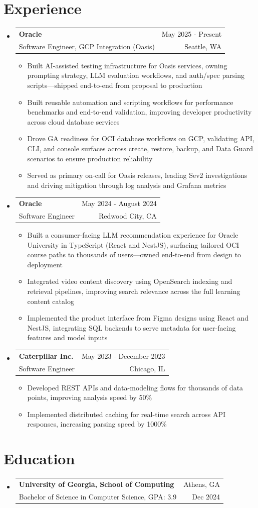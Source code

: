 \documentclass[letterpaper,11pt]{article}
\makeatletter
\newcommand{\resumeItem}[1]{
  \item\small{
    {#1 \vspace{-1pt}}
  }
}
\newcommand{\resumeSubheading}[4]{
  \vspace{-2pt}\item
    \begin{tabular*}{0.97\textwidth}[t]{l@{\extracolsep{\fill}}r}
      \textbf{#1} & #2 \\
      {\small#3} & {\small #4} \\
    \end{tabular*}\vspace{-7pt}
}
\newcommand{\resumeSubHeadingListStart}{\begin{itemize}[leftmargin=0.15in, label={}]}
\newcommand{\resumeSubHeadingListEnd}{\end{itemize}}
\newcommand{\resumeItemListStart}{\begin{itemize}[leftmargin=0.18in,itemsep=1pt,topsep=2pt]}
\newcommand{\resumeItemListEnd}{\end{itemize}\vspace{-5pt}}
\makeatother
\begin{document}
\section{Experience}
  \resumeSubHeadingListStart

    \resumeSubheading
  {Oracle}{May 2025 - Present}
  {Software Engineer, GCP Integration (Oasis)}{Seattle, WA}
  \resumeItemListStart
    \resumeItem{Built AI-assisted testing infrastructure for Oasis services, owning prompting strategy, LLM evaluation workflows, and auth/spec parsing scripts---shipped end-to-end from proposal to production}
    \resumeItem{Built reusable automation and scripting workflows for performance benchmarks and end-to-end validation, improving developer productivity across cloud database services}
    \resumeItem{Drove GA readiness for OCI database workflows on GCP, validating API, CLI, and console surfaces across create, restore, backup, and Data Guard scenarios to ensure production reliability}
    \resumeItem{Served as primary on-call for Oasis releases, leading Sev2 investigations and driving mitigation through log analysis and Grafana metrics}
  \resumeItemListEnd

    \resumeSubheading
      {Oracle}{May 2024 - August 2024}
      {Software Engineer}{Redwood City, CA}
      \resumeItemListStart
        \resumeItem{Built a consumer-facing LLM recommendation experience for Oracle University in TypeScript (React and NestJS), surfacing tailored OCI course paths to thousands of users---owned end-to-end from design to deployment}
        \resumeItem{Integrated video content discovery using OpenSearch indexing and retrieval pipelines, improving search relevance across the full learning content catalog}
        \resumeItem{Implemented the product interface from Figma designs using React and NestJS, integrating SQL backends to serve metadata for user-facing features and model inputs}
      \resumeItemListEnd

    \resumeSubheading
      {Caterpillar Inc.}{May 2023 - December 2023}
      {Software Engineer}{Chicago, IL}
      \resumeItemListStart
        \resumeItem{Developed REST APIs and data-modeling flows for thousands of data points, improving analysis speed by 50\%}
        \resumeItem{Implemented distributed caching for real-time search across API responses, increasing parsing speed by 1000\%}
      \resumeItemListEnd

  \resumeSubHeadingListEnd

\section{Education}
  \resumeSubHeadingListStart
    \resumeSubheading
      {University of Georgia, School of Computing}{Athens, GA}
      {Bachelor of Science in Computer Science, GPA: 3.9}{Dec 2024}
  \resumeSubHeadingListEnd
\end{document}
